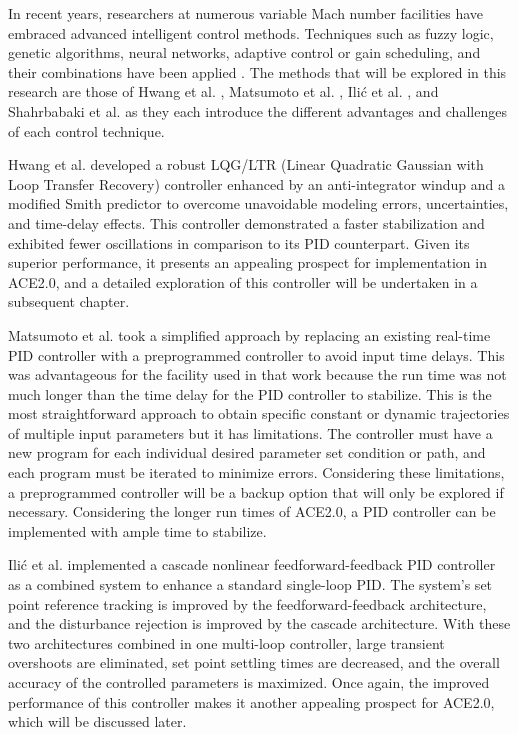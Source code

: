 In recent years, researchers at numerous variable Mach number facilities have embraced advanced intelligent control methods. Techniques such as fuzzy logic, genetic algorithms, neural networks, adaptive control or gain scheduling, and their combinations have been applied \cite{nott,shahrbabaki-1}. The methods that will be explored in this research are those of Hwang et al. \cite{hwang}, Matsumoto et al. \cite{matsumoto}, Ili\'c et al. \cite{ilic-2}, and Shahrbabaki et al. \cite{shahrbabaki-1} as they each introduce the different advantages and challenges of each control technique. 

Hwang et al. \cite{hwang} developed a robust LQG/LTR (Linear Quadratic Gaussian with Loop Transfer Recovery) controller enhanced by an anti-integrator windup and a modified Smith predictor to overcome unavoidable modeling errors, uncertainties, and time-delay effects. This controller demonstrated a faster stabilization and exhibited fewer oscillations in comparison to its PID counterpart. Given its superior performance, it presents an appealing prospect for implementation in ACE2.0, and a detailed exploration of this controller will be undertaken in a subsequent chapter.

Matsumoto et al. \cite{matsumoto} took a simplified approach by replacing an existing real-time PID controller with a preprogrammed controller to avoid input time delays. This was advantageous for the facility used in that work because the run time was not much longer than the time delay for the PID controller to stabilize. This is the most straightforward approach to obtain specific constant or dynamic trajectories of multiple input parameters but it has limitations. The controller must have a new program for each individual desired parameter set condition or path, and each program must be iterated to minimize errors. Considering these limitations, a preprogrammed controller will be a backup option that will only be explored if necessary. Considering the longer run times of ACE2.0, a PID controller can be implemented with ample time to stabilize.

Ili\'c et al. \cite{ilic-2} implemented a cascade nonlinear feedforward-feedback PID controller as a combined system to enhance a standard single-loop PID. The system's set point reference tracking is improved by the feedforward-feedback architecture, and the disturbance rejection is improved by the cascade architecture. With these two architectures combined in one multi-loop controller, large transient overshoots are eliminated, set point settling times are decreased, and the overall accuracy of the controlled parameters is maximized. Once again, the improved performance of this controller makes it another appealing prospect for ACE2.0, which will be discussed later.

